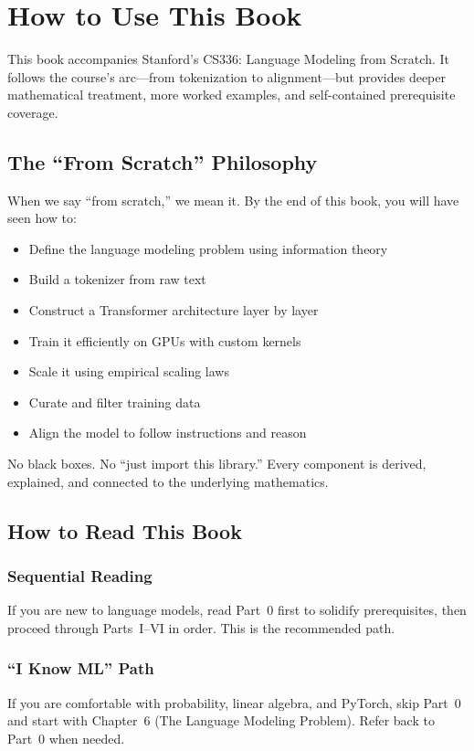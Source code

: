 \chapter{How to Use This Book}
\label{ch:00}

This book accompanies Stanford's CS336: Language Modeling from Scratch. It follows the course's arc---from tokenization to alignment---but provides deeper mathematical treatment, more worked examples, and self-contained prerequisite coverage.

\section{The ``From Scratch'' Philosophy}

When we say ``from scratch,'' we mean it. By the end of this book, you will have seen how to:
\begin{itemize}
  \item Define the language modeling problem using information theory
  \item Build a tokenizer from raw text
  \item Construct a Transformer architecture layer by layer
  \item Train it efficiently on GPUs with custom kernels
  \item Scale it using empirical scaling laws
  \item Curate and filter training data
  \item Align the model to follow instructions and reason
\end{itemize}

No black boxes. No ``just import this library.'' Every component is derived, explained, and connected to the underlying mathematics.

\section{How to Read This Book}

\subsection{Sequential Reading}
If you are new to language models, read Part~0 first to solidify prerequisites, then proceed through Parts~I--VI in order. This is the recommended path.

\subsection{``I Know ML'' Path}
If you are comfortable with probability, linear algebra, and PyTorch, skip Part~0 and start with Chapter~6 (The Language Modeling Problem). Refer back to Part~0 when needed.

